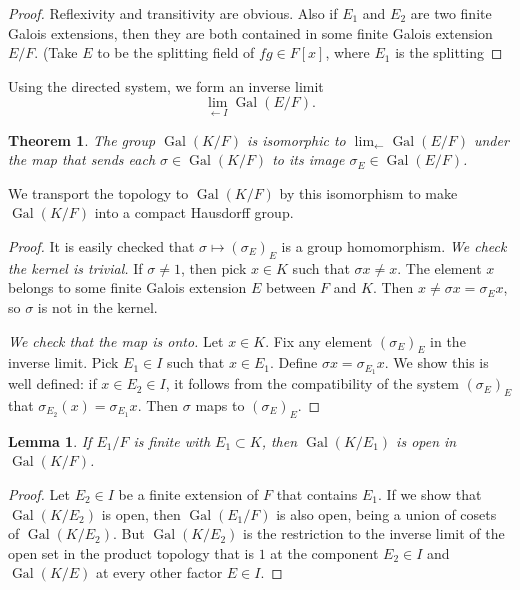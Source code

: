 \documentclass{amsart}
\def\op#1{{\operatorname{#1}}}
\newtheorem{theorem}[equation]{Theorem}
\newtheorem{lemma}[equation]{Lemma}
\def\claim#1{{\it #1}}
\begin{document}
\begin{proof}  Reflexivity and transitivity are obvious.  Also if $E_1$ and
$E_2$ are two finite Galois extensions, then they are both contained in
some finite Galois extension $E/F$.  (Take $E$ to be the splitting field
of $fg\in F[x]$, where $E_1$ is the splitting 
\end{proof}

Using the directed system, we form an inverse limit
\[
\lim_{\leftarrow I} \op{Gal}(E/F).
\]

\begin{theorem} The group $\op{Gal}(K/F)$ is isomorphic to $\lim_{\leftarrow}\op{Gal}(E/F)$
under the map that sends each $\sigma\in\op{Gal}(K/F)$ to its image $\sigma_E\in \op{Gal}(E/F)$.
\end{theorem}

We transport the topology to $\op{Gal}(K/F)$ by this isomorphism to make $\op{Gal}(K/F)$ into a compact Hausdorff group.

\begin{proof} It is easily checked that $\sigma\mapsto (\sigma_E)_E$ is a group homomorphism.
\claim{We check the kernel is trivial.}  If $\sigma\ne1$, then pick $x\in K$ such
that $\sigma x\ne x$.  The element $x$ belongs to some finite Galois extension $E$ between
$F$ and $K$.  Then $x\ne \sigma x = \sigma_E x$, so $\sigma$ is not in the kernel.

\claim{We check that the map is onto.}  Let $x\in K$.  Fix any element
$(\sigma_E)_E$ in the inverse limit.  Pick $E_1\in I$ such that $x\in E_1$.
Define $\sigma x = \sigma_{E_1} x$.  We show this is well defined: 
if $x\in {E_2}\in I$, it follows from the compatibility
of the system $(\sigma_E)_E$ that $\sigma_{E_2}(x) = \sigma_{E_1}x$.  Then $\sigma$
maps to $(\sigma_E)_E$.
\end{proof}

\begin{lemma}  If $E_1/F$ is finite with $E_1\subset K$,
then $\op{Gal}(K/E_1)$ is open in $\op{Gal}(K/F)$.
\end{lemma}

\begin{proof}  Let $E_2\in I$ be a finite extension of $F$ that contains $E_1$.  If we show
that $\op{Gal}(K/E_2)$ is open, then $\op{Gal}(E_1/F)$ is also open, being a union
of cosets of $\op{Gal}(K/E_2)$.  But $\op{Gal}(K/E_2)$ is the restriction to the
inverse limit of the open set in the product topology that is ${1}$ at the
component $E_2\in I$ and $\op{Gal}(K/E)$ at every other factor $E\in I$.
\end{proof}
\end{document}
